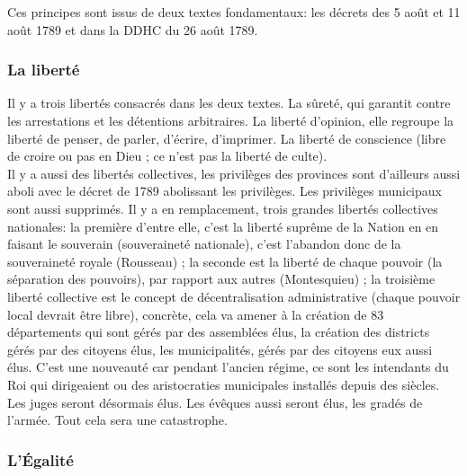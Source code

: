 \documentclass[10pt, a4paper, openany]{book}
\begin{document}
Ces principes sont issus de deux textes fondamentaux: les décrets des 5 août et 11 août 1789 et dans la DDHC du 26 août 1789.

\subsubsection{La liberté}

Il y a trois libertés consacrés dans les deux textes. La sûreté, qui garantit contre les arrestations et les détentions arbitraires. La liberté d'opinion, elle regroupe la liberté de penser, de parler, d'écrire, d'imprimer. La liberté de conscience (libre de croire ou pas en Dieu ; ce n'est pas la liberté de culte).  \\
Il y a aussi des libertés collectives, les privilèges des provinces sont d'ailleurs aussi aboli avec le décret de 1789 abolissant les privilèges. Les privilèges municipaux sont aussi supprimés. Il y a en remplacement, trois grandes libertés collectives nationales: la première d'entre elle, c'est la liberté suprême de la Nation en en faisant le souverain (souveraineté nationale), c'est l'abandon donc de la souveraineté royale (Rousseau) ; la seconde est la liberté de chaque pouvoir (la séparation des pouvoirs), par rapport aux autres (Montesquieu) ; la troisième liberté collective est le concept de décentralisation administrative (chaque pouvoir local devrait être libre), concrète, cela va amener à la création de 83 départements qui sont gérés par des assemblées élus, la création des districts gérés par des citoyens élus, les municipalités, gérés par des citoyens eux aussi élus. C'est une nouveauté car pendant l'ancien régime, ce sont les intendants du Roi qui dirigeaient ou des aristocraties municipales installés depuis des siècles. \\
Les juges seront désormais élus. Les évêques aussi seront élus, les gradés de l'armée. Tout cela sera une catastrophe.  

\subsubsection{L'Égalité}
\end{document}
